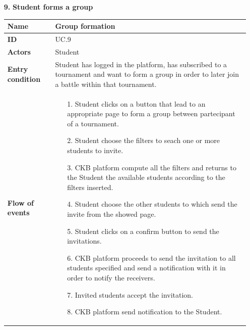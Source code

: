 \documentclass{article}
\begin{document}
{\begin{enumerate}
    \item[\textbf{9.}] \textbf{Student forms a group}
          \begin{xltabular}{\textwidth}
              {| >{\raggedright\arraybackslash}g | >{\raggedright\arraybackslash}X |}
              \hline
              \endfirsthead
              \hline
              \endhead
              \endfoot
              \hline
              \endlastfoot




              \textbf{Name} & Group formation\\
              \hline
              \textbf{ID} & UC.9\\
              \hline
              \textbf{Actors} & Student\\
              \hline
              \textbf{Entry condition} & Student has logged in the platform, has subscribed to a
              tournament and want to form a group in order to later join a battle within that
              tournament.\\
              \hline
              \textbf{Flow of events} &    \begin{enumerate}
                  \item[1.] Student clicks on a button that lead to
                        an appropriate page to form a group between partecipant
                        of a tournament.
                  \item[2.] Student choose the filters to seach one or more
                        students to invite.
                  \item[3.] CKB platform compute all the filters and returns to
                        the Student the available students according to the filters inserted.
                  \item[4.] Student choose the other students to which send
                        the invite from the showed page.
                  \item[5.] Student clicks on a confirm button to send the invitations.
                  \item[6.] CKB platform proceeds to send the invitation to all students
                        specified and send a notification with it in order to notify the receivers.
                  \item[7.] Invited students accept the invitation.
                  \item[8.] CKB platform send notification to the Student.
              \end{enumerate} \\

\end{xltabular}
\end{enumerate}}
\end{document}
